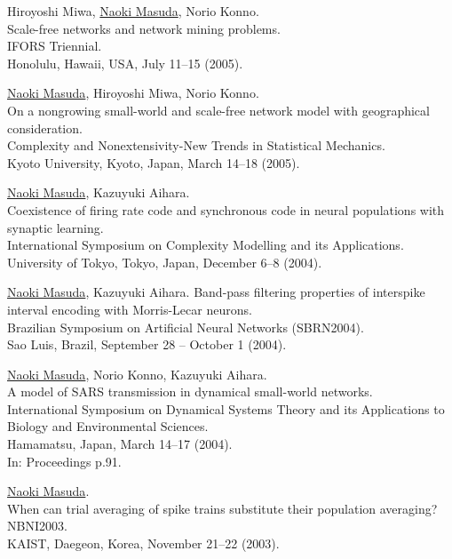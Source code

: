 \documentclass[11pt,letter]{article}
\begin{document}
\begin{etaremune}
\item Hiroyoshi Miwa, \underline{Naoki Masuda}, Norio Konno.\\
Scale-free networks and network mining problems.\\
IFORS Triennial.\\
Honolulu, Hawaii, USA, July 11--15 (2005).

\item \underline{Naoki Masuda}, Hiroyoshi Miwa, Norio Konno.\\
On a nongrowing small-world and scale-free network model with geographical consideration.\\
Complexity and Nonextensivity-New Trends in Statistical Mechanics.\\
Kyoto University, Kyoto, Japan, March 14--18 (2005).

\item \underline{Naoki Masuda}, Kazuyuki Aihara.\\
Coexistence of firing rate code and synchronous code in neural populations with synaptic learning.\\
International Symposium on Complexity Modelling and its Applications.\\
University of Tokyo, Tokyo, Japan, December 6--8 (2004).

\item \underline{Naoki Masuda}, Kazuyuki Aihara.
Band-pass filtering properties of interspike interval encoding with Morris-Lecar neurons.\\
Brazilian Symposium on Artificial Neural Networks (SBRN2004).\\
Sao Luis, Brazil, September 28 -- October 1 (2004).


\item \underline{Naoki Masuda}, Norio Konno, Kazuyuki Aihara.\\
A model of SARS transmission in dynamical small-world networks.\\
International Symposium on Dynamical Systems Theory and its Applications to Biology and Environmental Sciences.\\
Hamamatsu, Japan, March 14--17 (2004).\\
In: Proceedings p.91.

\item \underline{Naoki Masuda}.\\
When can trial averaging of spike trains substitute their population averaging?\\
NBNI2003.\\
KAIST, Daegeon, Korea, November 21--22 (2003).


\end{etaremune}
\end{document}
